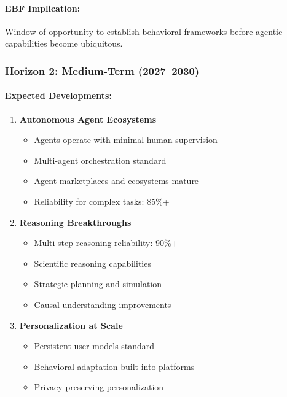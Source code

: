 \paragraph{EBF Implication:} Window of opportunity to establish behavioral
frameworks before agentic capabilities become ubiquitous.

\subsubsection{Horizon 2: Medium-Term (2027--2030)}

\paragraph{Expected Developments:}
\begin{enumerate}
    \item \textbf{Autonomous Agent Ecosystems}
    \begin{itemize}
        \item Agents operate with minimal human supervision
        \item Multi-agent orchestration standard
        \item Agent marketplaces and ecosystems mature
        \item Reliability for complex tasks: 85\%+
    \end{itemize}

    \item \textbf{Reasoning Breakthroughs}
    \begin{itemize}
        \item Multi-step reasoning reliability: 90\%+
        \item Scientific reasoning capabilities
        \item Strategic planning and simulation
        \item Causal understanding improvements
    \end{itemize}

    \item \textbf{Personalization at Scale}
    \begin{itemize}
        \item Persistent user models standard
        \item Behavioral adaptation built into platforms
        \item Privacy-preserving personalization
    \end{itemize}
\end{enumerate}


